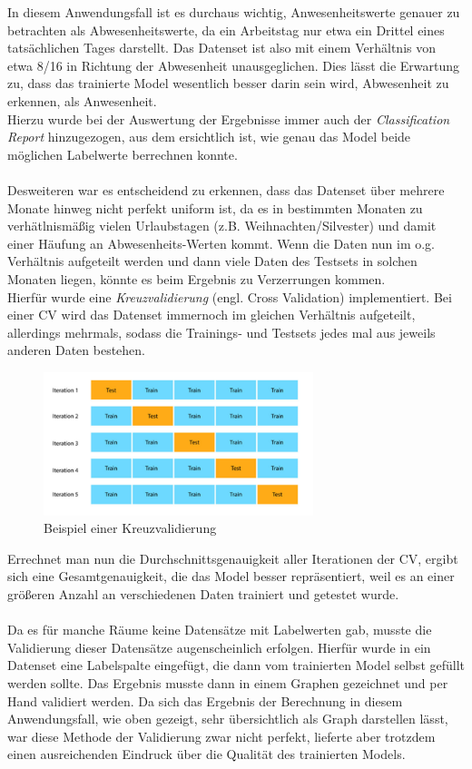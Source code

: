 \vspace{0.75cm}
In diesem Anwendungsfall ist es durchaus wichtig, Anwesenheitswerte genauer zu betrachten als 
Abwesenheitswerte, da ein Arbeitstag nur etwa ein Drittel eines tatsächlichen Tages darstellt. 
Das Datenset ist also mit einem Verhältnis von etwa 8/16 in Richtung der Abwesenheit unausgeglichen. Dies 
lässt die Erwartung zu, dass das trainierte Model wesentlich besser darin sein wird, Abwesenheit zu erkennen,
als Anwesenheit.\\
Hierzu wurde bei der Auswertung der Ergebnisse immer auch der \textit{Classification Report} hinzugezogen,
aus dem ersichtlich ist, wie genau das Model beide möglichen Labelwerte berrechnen konnte.\\\\
Desweiteren war es entscheidend zu erkennen, dass das Datenset über mehrere Monate hinweg nicht perfekt uniform 
ist, da es in bestimmten Monaten zu verhätlnismäßig vielen Urlaubstagen (z.B. Weihnachten/Silvester) und damit 
einer Häufung an Abwesenheits-Werten kommt.
Wenn die Daten nun im o.g. Verhältnis aufgeteilt werden und dann viele Daten des Testsets in solchen Monaten 
liegen, könnte es beim Ergebnis zu Verzerrungen kommen.\\
Hierfür wurde eine \textit{Kreuzvalidierung} (engl. Cross Validation) implementiert. Bei einer CV wird das 
Datenset immernoch im gleichen Verhältnis aufgeteilt, allerdings mehrmals, sodass die Trainings- und Testsets 
jedes mal aus jeweils anderen Daten bestehen.

\begin{figure}[h]
    \centering
    \includegraphics[width=0.7\textwidth]{pic/CV.png}
    \caption{Beispiel einer Kreuzvalidierung}
    \label{fig:CV}
\end{figure}

Errechnet man nun die Durchschnittsgenauigkeit aller Iterationen der CV, ergibt sich eine Gesamtgenauigkeit, 
die das Model besser repräsentiert, weil es an einer größeren Anzahl an verschiedenen Daten trainiert und 
getestet wurde.
\\\\
Da es für manche Räume keine Datensätze mit Labelwerten gab, musste die Validierung dieser Datensätze 
augenscheinlich erfolgen. Hierfür wurde in ein Datenset eine Labelspalte eingefügt, die dann vom trainierten
Model selbst gefüllt werden sollte. Das Ergebnis musste dann in einem Graphen gezeichnet und per Hand validiert 
werden. Da sich das Ergebnis der Berechnung in diesem Anwendungsfall, wie oben gezeigt, sehr übersichtlich als 
Graph darstellen lässt, war diese Methode der Validierung zwar nicht perfekt, lieferte aber trotzdem einen 
ausreichenden Eindruck über die Qualität des trainierten Models.


